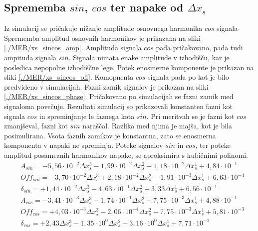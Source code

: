 \subsection{Sprememba $sin$, $cos$ ter napake od $\Delta x_s$}
Iz simulacij se pričakuje nižanje amplitude osnovnega harmonika $cos$ signala- Sprememba amplitud osnovnih harmonikov je prikazana na sliki \ref{./MER/xs_sincos_amp}. Amplituda signala $cos$ pada pričakovano, pada tudi ampituda signala $sin$. Signala nimata enake amplitude v izhodišču, kar je posledica nepopolne izhodiščne lege. Potek enosmerne komponente je prikazan na sliki \ref{./MER/xs_sincos_off}. Komopnenta $cos$ signala pada po kot je bilo predvideno v simulacijah. Fazni zamik signalov je prikazan na sliki \ref{./MER/xs_sincos_phase}. Pričakovano po simulacijah se fazni zamik med signaloma povečuje. Rezultati simulacij so prikazovali konstanten fazni kot signala $cos$ in spreminjanje le faznega kota $sin$. Pri meritvah se je fazni kot $cos$ zmanjševal, fazni kot $sin$ naraščal. Razlika med njima je majša, kot je bila posimulirana. Vsota faznih zamikov je konstantna, zato se enosmerna komponenta v napaki ne spreminja.
Poteke signalov $sin$ in $cos$, ter poteke amplitud posameznih harmonikov napake, se aproksimira s kubičnimi polinomi.
\begin{eqnarray}
&A_{sin} = -5,56\cdot 10^{-2}\Delta x_s^3-1,99\cdot 10^{-2}\Delta x_s^2-1,18\cdot 10^{-2}\Delta x_s^1+4,84\cdot 10^{-1}            \\    
&Off_{sin} = -3,70\cdot 10^{-2}\Delta x_s^3+2,18\cdot 10^{-2}\Delta x_s^2-1,91\cdot 10^{-3}\Delta x_s^1+6,63\cdot 10^{-4}            \\  
&\delta_{sin} = +1,44\cdot 10^{-2}\Delta x_s^3-4,63\cdot 10^{-1}\Delta x_s^2+3,33            \Delta x_s^1+6,56\cdot 10^{-1}            \\
&A_{cos} = -3,41\cdot 10^{-3}\Delta x_s^3-1,74\cdot 10^{-1}\Delta x_s^2+7,75\cdot 10^{-3}\Delta x_s^1+4,88\cdot 10^{-1}            \\    
&Off_{cos} = +4,03\cdot 10^{-3}\Delta x_s^3-2,06\cdot 10^{-4}\Delta x_s^2-7,75\cdot 10^{-3}\Delta x_s^1+5,81\cdot 10^{-3}            \\  
&\delta_{cos} = +2,43            \Delta x_s^3-1,35\cdot 10^{0}\Delta x_s^2-3,16\cdot 10^{0}\Delta x_s^1+7,71\cdot 10^{-1} 
\end{eqnarray}
